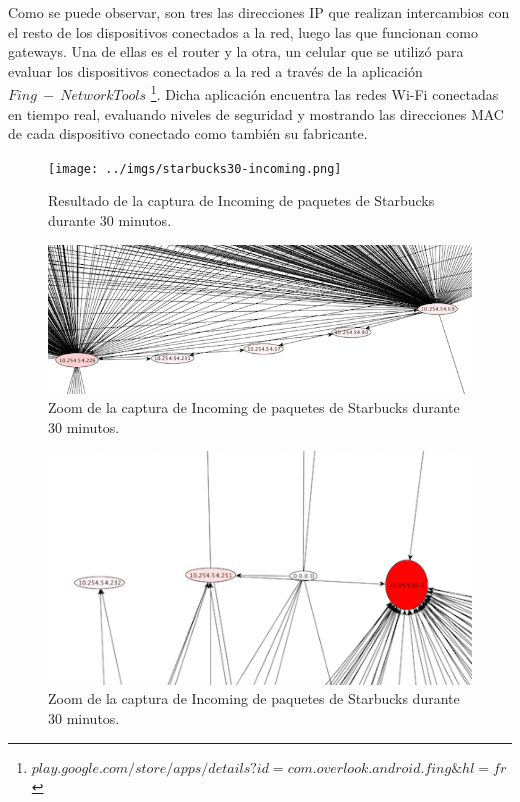 \documentclass[10pt, a4paper]{article}
\begin{document}
Como se puede observar, son tres las direcciones IP que realizan intercambios con el resto de los dispositivos conectados a la red, luego las que funcionan como gateways. Una de ellas es el router y la otra, un celular que se utilizó para evaluar los dispositivos conectados a la red a través de la aplicación $Fing\ -\ Network Tools$ \footnote{$play.google.com/store/apps/details?id=com.overlook.android.fing\&hl=fr$}. Dicha aplicación encuentra las redes Wi-Fi conectadas en tiempo real, evaluando niveles de seguridad y mostrando las direcciones MAC de cada dispositivo conectado como también su fabricante. %

\begin{figure}[H] %
\begin{center}
\texttt{[image: ../imgs/starbucks30-incoming.png]}
\caption{Resultado de la captura de Incoming de paquetes de Starbucks durante 30 minutos.}
\end{center}
\end{figure}

\begin{figure}[H] %
\begin{center}
\includegraphics[width=450pt]{../imgs/zoom-starbucks-incoming.png}
\caption{Zoom de la captura de Incoming de paquetes de Starbucks durante 30 minutos.}
\end{center}
\end{figure}

\begin{figure}[H] %
\begin{center}
\includegraphics[width=450pt]{../imgs/zoom-starbucks-incoming2.png}
\caption{Zoom de la captura de Incoming de paquetes de Starbucks durante 30 minutos.}
\end{center}
\end{figure}
\end{document}
